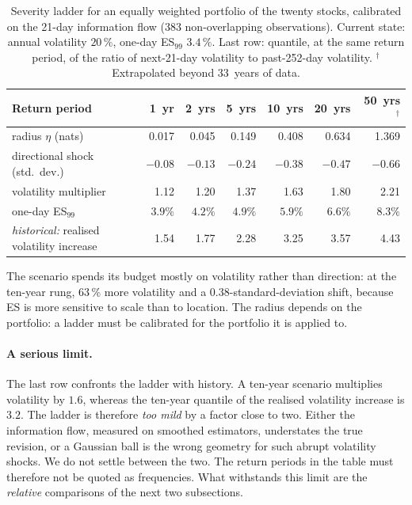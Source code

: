 \documentclass[11pt]{article}
\theoremstyle{definition}
\begin{document}
\begin{table}[htbp]
\centering
\small
\begin{tabular}{@{}lrrrrrr@{}}
\toprule
Return period & 1~yr & 2~yrs & 5~yrs & 10~yrs & 20~yrs & 50~yrs$^\dagger$ \\
\midrule
radius $\eta$ (nats) & 0.017 & 0.045 & 0.149 & 0.408 & 0.634 & 1.369 \\
directional shock (std.\ dev.) & $-0.08$ & $-0.13$ & $-0.24$ & $-0.38$ & $-0.47$ & $-0.66$ \\
volatility multiplier & 1.12 & 1.20 & 1.37 & 1.63 & 1.80 & 2.21 \\
one-day ES$_{99}$ & $3.9\%$ & $4.2\%$ & $4.9\%$ & $5.9\%$ & $6.6\%$ & $8.3\%$ \\
\midrule
\emph{historical:} realised volatility increase & 1.54 & 1.77 & 2.28 & 3.25 & 3.57 & 4.43 \\
\bottomrule
\end{tabular}
\caption{Severity ladder for an equally weighted portfolio of the twenty
stocks, calibrated on the 21-day information flow (383 non-overlapping
observations). Current state: annual volatility $20\,\%$, one-day ES$_{99}$
$3.4\,\%$. Last row: quantile, at the same return period, of the ratio of
next-21-day volatility to past-252-day volatility. $^\dagger$ Extrapolated
beyond 33~years of data.}
\label{tab:ladder}
\end{table}

The scenario spends its budget mostly on volatility rather than direction: at
the ten-year rung, $63\,\%$ more volatility and a $0.38$-standard-deviation
shift, because ES is more sensitive to scale than to location. The radius
depends on the portfolio: a ladder must be calibrated for the portfolio it is
applied to.

\paragraph{A serious limit.} The last row confronts the ladder with history.
A ten-year scenario multiplies volatility by $1.6$, whereas the ten-year
quantile of the realised volatility increase is $3.2$. The ladder is therefore
\emph{too mild} by a factor close to two. Either the information flow,
measured on smoothed estimators, understates the true revision, or a Gaussian
ball is the wrong geometry for such abrupt volatility shocks. We do not
settle between the two. The return periods in the table must therefore not be
quoted as frequencies. What withstands this limit are the \emph{relative}
comparisons of the next two subsections.
\end{document}
